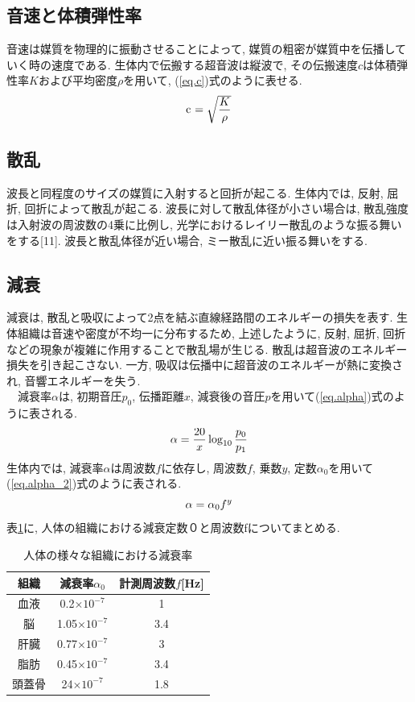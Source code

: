 \subsection{音速と体積弾性率}
音速は媒質を物理的に振動させることによって, 媒質の粗密が媒質中を伝播していく時の速度である. 生体内で伝搬する超音波は縦波で, その伝搬速度$c$は体積弾性率$K$および平均密度$\rho$を用いて, (\ref{eq.c})式のように表せる.
\begin{equation}
\label{eq.c}
\\$c$\ = \sqrt{\dfrac{K}{\rho}}
\end{equation}
\subsection{散乱}
波長と同程度のサイズの媒質に入射すると回折が起こる. 生体内では, 反射, 屈折, 回折によって散乱が起こる. 波長に対して散乱体径が小さい場合は, 散乱強度は入射波の周波数の4乗に比例し, 光学におけるレイリー散乱のような振る舞いをする[11]. 波長と散乱体径が近い場合, ミー散乱に近い振る舞いをする. 
\subsection{減衰}
減衰は, 散乱と吸収によって2点を結ぶ直線経路間のエネルギーの損失を表す. 生体組織は音速や密度が不均一に分布するため, 上述したように, 反射, 屈折, 回折などの現象が複雑に作用することで散乱場が生じる. 散乱は超音波のエネルギー損失を引き起こさない. 一方, 吸収は伝播中に超音波のエネルギーが熱に変換され, 音響エネルギーを失う.
\\\ \ 減衰率$\alpha$は, 初期音圧$p_0$, 伝播距離$x$, 減衰後の音圧$p$を用いて(\ref{eq.alpha})式のように表される.
\begin{equation}
\label{eq.alpha}
\\\alpha = \frac{20}{x}  \log_{10} \frac{p_0}{p_1}
\end{equation}
生体内では, 減衰率$\alpha$は周波数$f$に依存し, 周波数$f$, 乗数$y$, 定数$\alpha_0$を用いて(\ref{eq.alpha_2})式のように表される.
\begin{equation}
\label{eq.alpha_2}
\\\alpha = \alpha_0f^y
\end{equation}
表\ref{table_soshiki}に, 人体の組織における減衰定数０と周波数fについてまとめる.

\begin{table}[htb]
\centering
\caption{人体の様々な組織における減衰率}
\label{table_soshiki}
\begin{tabular}{|c|c|c|}
\hline
組織 & 減衰率$\alpha_0$ & 計測周波数$f$[Hz]  \\ \hline
血液 & 0.2$\times$$10^{-7}$ &      1 \\ \hline
脳   & 1.05$\times$$10^{-7}$ &      3.4\\ \hline
肝臓  & 0.77$\times$$10^{-7}$ &     3 \\ \hline
脂肪 & 0.45$\times$$10^{-7}$ &     3.4 \\ \hline
頭蓋骨  & 24$\times$$10^{-7}$ &     1.8  \\ \hline
\end{tabular}
\end{table}

